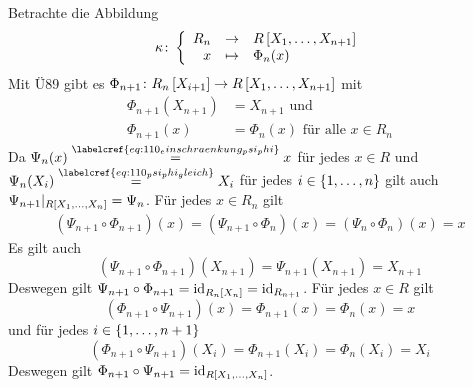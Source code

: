 \begin{exercisePage}
\begin{solution}
		Betrachte die Abbildung 
		\begin{align} \label{eq: 110_def_kappa}
			\kappa \colon \left\lbrace \begin{array}{rcl} R_n & \to & R \left[ X_1, \dots, X_{n+1} \right] \\x & \mapsto & \Phi_n(x) \end{array} \right.
		\end{align}
		Mit Ü89 gibt es $\Phi_{n+1} \colon R_n \left[ X_{i+1} \right] \to R \left[ X_1, \dots, X_{n+1} \right]$ mit 
		\begin{subequations}
			\begin{align}
				\Phi_{n+1}(X_{n+1}) &= X_{n+1} \text{ und} \label{eq: 110_eig_phi_n+1_poly} \\
				\Phi_{n+1}(x)       &= \Phi_n(x) \text{ für alle } x \in R_n \label{eq: 110_eig_phi_n+1_x}
			\end{align}
		\end{subequations}
		Da $\Psi_n(x) \overset{\labelcref{eq: 110_einschraenkung_psi_phi}}{=} x$ für jedes $x \in R$ und $\Psi_n(X_i) \overset{\labelcref{eq: 110_psi_phi_gleich}}{=} X_i$ für jedes $i \in \left\{ 1, \dots, n \right\}$ gilt auch $\Psi_{n+1} |_{R \left[ X_1, \dots, X_n \right]} = \Psi_n$. Für jedes $x \in R_n$ gilt
        \begin{align}
            \left(\Psi_{n+1} \circ \Phi_{n+1} \right)(x) 
            = \left(\Psi_{n+1} \circ \Phi_{n} \right)(x)
            = \left(\Psi_{n} \circ \Phi_{n} \right)(x) 
            = x
        \end{align}
        Es gilt auch 
        \begin{equation*}
            \left(\Psi_{n+1} \circ \Phi_{n+1} \right)(X_{n+1}) 
            = \Psi_{n+1} (X_{n+1})
            = X_{n+1}
        \end{equation*}
		Deswegen gilt $\Psi_{n+1} \circ \Phi_{n+1} = \operatorname{id}_{R_n \left[ X_n \right]} = \operatorname{id}_{R_{n+1}}$. Für jedes $x \in R$ gilt
         \begin{equation*}
             \left(\Phi_{n+1} \circ \Psi_{n+1} \right) (x) = \Phi_{n+1}(x) = \Phi_n(x) = x
         \end{equation*}
         und für jedes $i \in \left\{ 1, \dots, n+1 \right\}$
         \begin{equation*}
             \left( \Phi_{n+1} \circ \Psi_{n+1} \right) (X_i) = \Phi_{n+1}(X_i) = \Phi_n(X_i) = X_i
         \end{equation*}
         Deswegen gilt $\Phi_{n+1} \circ \Psi_{n+1} = \operatorname{id}_{R \left[ X_1, \dots, X_n \right]}$.
	\end{solution}
    
    \pagebreak
    

\end{exercisePage}
